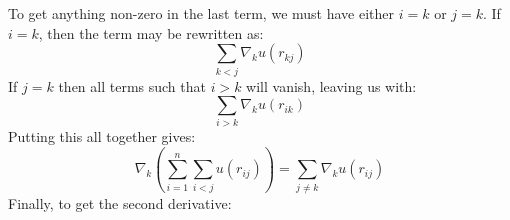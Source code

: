 \documentclass[a4paper, 10pt]{article}
\begin{document}
\begin{appendices}
\begin{equation}
\end{equation} 
To get anything non-zero in the last term, we must have either $i=k$ or $j=k$. If $i=k$, then the term may be rewritten as:
\begin{equation}
\sum_{k<j}\nabla_k u(r_{kj})
\end{equation}
If $j=k$ then all terms such that $i>k$ will vanish, leaving us with:
\begin{equation}
\sum_{i>k} \nabla_k u(r_{ik})
\end{equation}
Putting this all together gives:
\begin{equation}
\nabla_k \left(\sum_{i=1}^n \sum_{i<j} u(r_{ij})\right)=\sum_{j\neq k} \nabla_k u(r_{ij})
\end{equation}
Finally, to get the second derivative:

\end{appendices}
\end{document}
